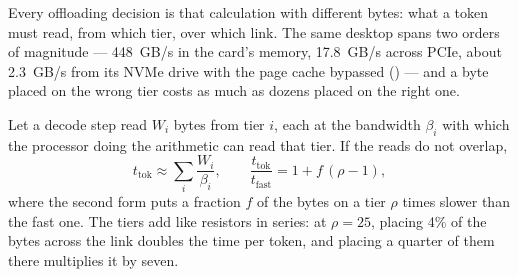 Every offloading decision is that calculation with different bytes: what a
token must read, from which tier, over which link. The same desktop spans two
orders of magnitude --- 448~GB/s in the card's memory, 17.8~GB/s across PCIe,
about 2.3~GB/s from its NVMe drive with the page cache bypassed
() --- and a byte placed on the wrong tier costs as much
as dozens placed on the right one.



Let a decode step read $W_i$ bytes from tier $i$, each at the bandwidth
$\beta_i$ with which the processor doing the arithmetic can read that tier. If
the reads do not overlap,
\begin{equation}
t_{\mathrm{tok}} \approx \sum_i \frac{W_i}{\beta_i},
\qquad
\frac{t_{\mathrm{tok}}}{t_{\mathrm{fast}}} = 1 + f\,(\rho - 1),
\label{eq:offload-time}
\end{equation}
where the second form puts a fraction $f$ of the bytes on a tier $\rho$ times
slower than the fast one. The tiers add like resistors in series: at
$\rho = 25$, placing 4\% of the bytes across the link doubles the time per
token, and placing a quarter of them there multiplies it by seven.

